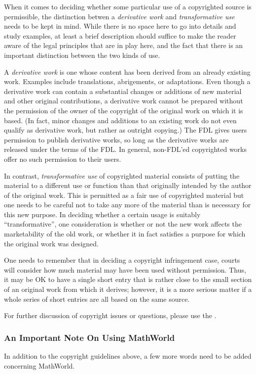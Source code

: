 When it comes to deciding whether some particular use of a copyrighted
source is permissible, the distinction betwen a \emph{derivative work}
and \emph{transformative use} needs to be kept in mind. While there
is no space here to go into details and study examples, at least a
brief description should suffice to make the reader aware of the legal
principles that are in play here, and the fact that there is an
important distinction between the two kinds of use.

A \emph{derivative work} is one whose content has been derived from an
already existing work. Examples include translations, abrigements, or
adaptations. Even though a derivative work can contain a substantial
changes or additions of new material and other original contributions,
a derivative work cannot be prepared without the permission of the
owner of the copyright of the original work on which it is based. (In
fact, minor changes and additions to an existing work do not even
qualify as derivative work, but rather as outright copying.) The FDL
gives users permission to publish derivative works, so long as the
derivative works are released under the terms of the FDL. In general,
non-FDL'ed copyrighted works offer no such permission to their users.

In contrast, \emph{transformative use} of copyrighted material
consists of putting the material to a different use or function than
that originally intended by the author of the original work. This is
permitted as a fair use of copyrighted material but one needs to be
careful not to take any more of the material than is necessary for
this new purpose. In deciding whether a certain usage is suitably
``transformative'', one consideration is whether or not the new work
affects the marketability of the old work, or whether it in fact
satisfies a purpose for which the original work was designed.

One needs to remember that in deciding a copyright infringement case,
courts will consider how much material may have been used without
permission. Thus, it may be OK to have a single short entry that is
rather close to the small section of an original work from which it
derives; however, it is a more serious matter if a whole series of
short entries are all based on the same source.

For further discussion of copyright issues or questions, please use
the .

\subsubsection*{An Important Note On Using MathWorld}
In addition to the copyright guidelines above, a few more words need
to be added concerning MathWorld.

